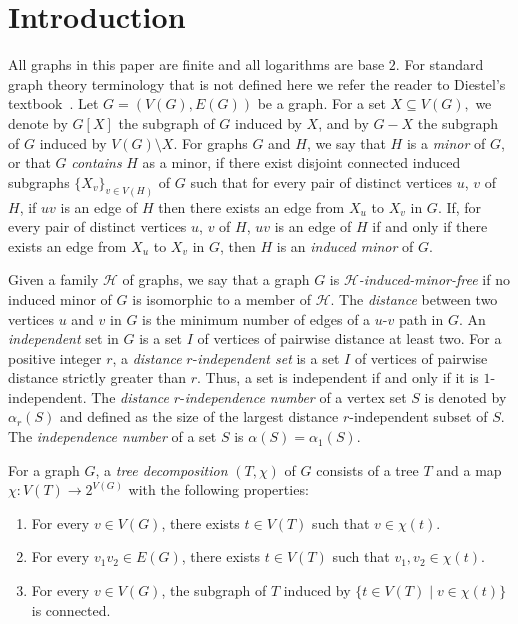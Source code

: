 \section{Introduction}
All graphs in this paper are finite and all logarithms are base $2$.
%
For standard graph theory terminology that is not defined here we refer the reader to Diestel's textbook~\cite{diestel2025graph}.
%
Let $G = (V(G),E(G))$ be a graph. For a set $X \subseteq V(G),$ we denote by $G[X]$ the subgraph of $G$ induced by $X$, and by $G - X$ the subgraph of $G$ induced by $V(G) \setminus X$. 
%
For graphs $G$ and $H$, we say that $H$ is a {\em minor} of $G$, or that $G$ {\em contains} $H$ as a minor, if there exist disjoint connected induced subgraphs $\{X_v\}_{v \in V(H)}$ of $G$ 
such that for every pair of distinct vertices $u$, $v$ of $H$, if $uv$ is an edge of $H$ then there exists an edge from $X_u$ to $X_v$ in $G$. 
If, for every pair of distinct vertices $u$, $v$ of $H$, $uv$ is an edge of $H$ if and only if there exists an edge from $X_u$ to $X_v$ in $G$, then $H$ is an {\em induced minor} of $G$.

Given a family $\mathcal{H}$ of graphs, we say that a graph $G$ is {\em $\mathcal{H}$-induced-minor-free} if no induced minor of $G$ is isomorphic to a member of $\mathcal{H}$.
% 
The {\em distance} between two vertices $u$ and $v$ in $G$ is the minimum number of edges of a $u$-$v$ path in $G$. An {\em independent} set in $G$ is a set $I$ of vertices of pairwise distance at least two. For a positive integer $r$, a {\em distance} $r$-{\em independent set} is a set $I$ of vertices of pairwise distance strictly greater than $r$. Thus, a set is independent if and only if it is $1$-independent.
%
The {\em distance} $r$-{\em independence number} of a vertex set $S$ is denoted by $\alpha_r(S)$ and defined as the size of the largest distance $r$-independent subset of $S$. The {\em independence number} of a set $S$ is $\alpha(S) = \alpha_1(S)$.

For a graph $G$, a \emph{tree decomposition} $(T, \chi)$ of $G$ consists of a tree $T$ and a map $\chi\colon V(T) \to 2^{V(G)}$ with the following properties:
\begin{enumerate}
\itemsep -.2em
    \item For every $v \in V(G)$, there exists $t \in V(T)$ such that $v \in \chi(t)$.

    \item For every $v_1v_2 \in E(G)$, there exists $t \in V(T)$ such that $v_1, v_2 \in \chi(t)$.

    \item For every $v \in V(G)$, the subgraph of $T$ induced by $\{t \in V(T) \mid v \in \chi(t)\}$ is connected.
\end{enumerate}

